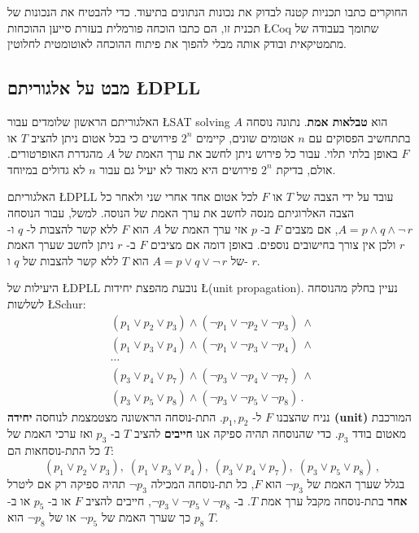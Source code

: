 החוקרים כתבו תכניות קטנה לבדוק את נכונות הנתונים בתיעוד. כדי להבטיח את הנכונות של תכנית זו, הם כתבו הוכחה פורמלית בעזרת סייען ההוכחות
\L{Coq}
שתומך בעבודה של מתמטיקאית ובודק אותה מבלי להפוך את פיתוח ההוכחה לאוטומטית לחלוטין.

\subsection{מבט על אלגוריתם \L{DPLL}}

האלגוריתם הראשון שלומדים עבור
\L{SAT solving}
הוא
\textbf{טבלאות אמת}.
נתונה נוסחה 
$A$
בתתחשיב הפסוקים עם 
$n$
אטומים שונים, קיימים
$2^n$
פירושים כי בכל אטום ניתן להציב
$T$
או
$F$
באופן בלתי תלוי. עבור כל פירוש ניתן לחשב את ערך האמת של
$A$
מהגדרת האופרטורים. אולם, בדיקת
$2^n$
פירושים היא מאוד לא יעיל גם עבור
$n$
לא גדולים במיוחד.

האלגוריתם
\L{DPLL}
עובד על ידי הצבה של
$T$
או
$F$
לכל אטום אחד אחרי שני ולאחר כל הצבה האלרוגיתם מנסה לחשב את ערך האמת של הנוסה. למשל, עבור הנוסחה
$A=p \wedge q \wedge \neg\, r$,
אם מצבים
$F$
ב-%
$p$
אזי ערך האמת של
$A$
הוא
$F$
ללא קשר להצבות ל-%
$q$
ו-%
$r$
ולכן אין צורך בחישובים נוספים. באופן דומה אם מציבים 
$F$
ב-%
$r$
ניתן לחשב שערך האמת של 
$A=p\vee q \vee \neg\, r$
הוא 
$T$
ללא קשר להצבות של
$q$
ו-%
$r$.

היעילות של
\L{DPLL}
נובעת מהפצת יחידות 
\L{(unit propagation)}.
נעיין בחלק מהנוסחה לשלשות
\L{Schur}:
\begin{equation}
\begin{array}{l}\label{eq.schur3}
(p_1 \vee p_2 \vee p_3) \wedge (\neg p_1 \vee \neg p_2 \vee \neg p_3) \:\wedge \\
(p_1 \vee p_3 \vee p_4) \wedge (\neg p_1 \vee \neg p_3 \vee \neg p_4) \:\wedge \\
\cdots\\
(p_3 \vee p_4 \vee p_7) \wedge (\neg p_3 \vee \neg p_4 \vee \neg p_7) \:\wedge \\
(p_3 \vee p_5 \vee p_8) \wedge (\neg p_3 \vee \neg p_5 \vee \neg p_8)\,.
\end{array}
\end{equation}
נניח שהצבנו
$F$
ל-%
$p_1,p_2$.
התת-נוסחה הראשונה מצטמצמת לנוחסה
\textbf{יחידה (unit)}
המורכבת מאטום בודד
$p_3$.
כדי שהנוסחה תהיה ספיקה אנו
\textbf{חייבים}
להציב 
$T$
ב-%
$p_3$
ואז ערכי האמת של כל התת-נוסחאות הם
$T$:
\[
(p_1 \vee p_2 \vee p_3),\;(p_1 \vee p_3 \vee p_4),\;
(p_3 \vee p_4 \vee p_7),\;(p_3 \vee p_5 \vee p_8)\,,
\]
בגלל שערך האמת של
$\neg p_3$
הוא
$F$,
כל תת-נוסחה המכילה 
$\neg p_3$
תהיה ספיקה רק אם ליטרל
\textbf{אחר}
בתת-נוסחה מקבל ערך אמת
$T$.
ב-%
$\neg p_3 \vee \neg p_5 \vee \neg p_8$, 
חייבים להציב
$F$
או ב-%
$p_5$
או ב-%
$p_8$
כך שערך האמת של
$\neg p_5$
או של
$\neg p_8$
הוא
$T$.

